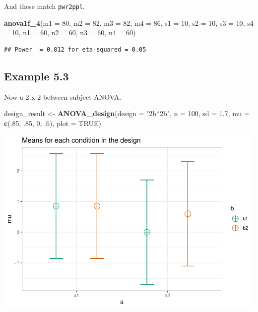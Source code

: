 \documentclass[
]{book}
\newenvironment{Shaded}{\begin{snugshade}}{\end{snugshade}}
\newcommand{\DataTypeTok}[1]{\textcolor[rgb]{0.13,0.29,0.53}{#1}}
\newcommand{\DecValTok}[1]{\textcolor[rgb]{0.00,0.00,0.81}{#1}}
\newcommand{\FloatTok}[1]{\textcolor[rgb]{0.00,0.00,0.81}{#1}}
\newcommand{\KeywordTok}[1]{\textcolor[rgb]{0.13,0.29,0.53}{\textbf{#1}}}
\newcommand{\NormalTok}[1]{#1}
\newcommand{\OtherTok}[1]{\textcolor[rgb]{0.56,0.35,0.01}{#1}}
\newcommand{\StringTok}[1]{\textcolor[rgb]{0.31,0.60,0.02}{#1}}
\begin{document}
And these match \texttt{pwr2ppl}.

\begin{Shaded}
\begin{Highlighting}[]
\KeywordTok{anova1f_4}\NormalTok{(}\DataTypeTok{m1 =} \DecValTok{80}\NormalTok{, }\DataTypeTok{m2 =} \DecValTok{82}\NormalTok{, }\DataTypeTok{m3 =} \DecValTok{82}\NormalTok{, }\DataTypeTok{m4 =} \DecValTok{86}\NormalTok{,}
          \DataTypeTok{s1 =} \DecValTok{10}\NormalTok{, }\DataTypeTok{s2 =} \DecValTok{10}\NormalTok{, }\DataTypeTok{s3 =} \DecValTok{10}\NormalTok{, }\DataTypeTok{s4 =} \DecValTok{10}\NormalTok{,}
          \DataTypeTok{n1 =} \DecValTok{60}\NormalTok{, }\DataTypeTok{n2 =} \DecValTok{60}\NormalTok{, }\DataTypeTok{n3 =} \DecValTok{60}\NormalTok{, }\DataTypeTok{n4 =} \DecValTok{60}\NormalTok{)}
\end{Highlighting}
\end{Shaded}

\begin{verbatim}
## Power  = 0.812 for eta-squared = 0.05
\end{verbatim}

\hypertarget{example-5.3}{%
\subsection{Example 5.3}\label{example-5.3}}

Now a 2 x 2 between-subject ANOVA.

\begin{Shaded}
\begin{Highlighting}[]
\NormalTok{design_result <-}\StringTok{ }\KeywordTok{ANOVA_design}\NormalTok{(}\DataTypeTok{design =} \StringTok{"2b*2b"}\NormalTok{,}
                              \DataTypeTok{n =} \DecValTok{100}\NormalTok{,}
                              \DataTypeTok{sd =} \FloatTok{1.7}\NormalTok{,}
                              \DataTypeTok{mu =} \KeywordTok{c}\NormalTok{(.}\DecValTok{85}\NormalTok{, }\FloatTok{.85}\NormalTok{, }
                                     \DecValTok{0}\NormalTok{, }\FloatTok{.6}\NormalTok{),}
                              \DataTypeTok{plot =} \OtherTok{TRUE}\NormalTok{)}
\end{Highlighting}
\end{Shaded}

\includegraphics{SuperpowerValidation_files/figure-latex/aberson_5.3.2-1.pdf}
\end{document}
